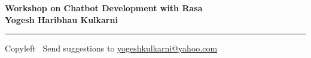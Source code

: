 
\graphicspath{{images/}}

\footnotesize


\begin{center}
\Large{\textbf{Workshop on Chatbot Development with Rasa\\ Yogesh Haribhau Kulkarni}}  
\end{center}

\begin{multicols}{2}

\end{multicols}

\rule{\linewidth}{0.25pt}
\scriptsize
Copyleft \textcopyleft\  Send suggestions to 
\href{http://www.yogeshkulkarni.com}{yogeshkulkarni@yahoo.com}


